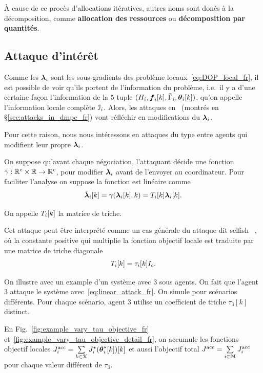\documentclass[../main.tex]{subfiles}
\begin{document}
À cause de ce procès d'allocations itératives, autres noms sont donés à la décomposition, comme \textbf{allocation des ressources} ou \textbf{décomposition par quantités}.

\subsection{Attaque d'intérêt}\label{sec:attack-interest_fr}

Comme les $\boldsymbol{\lambda}_{i}$ sont les sous-gradients des problème locaux~\eqref{eq:DOP_local_fr}, il est possible de voir qu'ils portent de l'information du problème, i.e.\ il y a d'une certaine façon l'information de la $5$-tuple $(H_{i},\vec{f}_{i}[k],\bar{\Gamma}_{i},\thetaik)$, qu'on appelle l'information locale complète $\mathcal{I}_{i}$.
Alors, les attaques en~\cite{VelardeEtAl2018} (montrés en \S\ref{sec:attacks_in_dmpc_fr}) vont réfléchir en modifications du $\boldsymbol{\lambda}_{i}$.

Pour cette raison, nous nous intéressons en attaques du type \fdi{} entre agents qui modifient leur propre $\boldsymbol{\lambda}_{i}$.

On suppose qu'avant chaque négociation, l'attaquant décide une fonction ${\gamma:\mathbb{R}^{c}\times\mathbb{R}\to \mathbb{R}^{c}}$, pour modifier $\boldsymbol{\lambda}_{i}$ avant de l'envoyer au coordinateur.
Pour faciliter l'analyse on suppose la fonction est linéaire comme
\begin{equation}
  \label{eq:linear_attack_fr}
  \lambdaicheat[k]=\gamma(\lambdaik,k)=\Tik\lambdaik.
\end{equation}

On appelle $T_{i}[k]$ la matrice de triche.

Cet attaque peut être interprété comme un cas générale du attaque dit selfish ~\cite{VelardeEtAl2018},
où la constante positive qui multiplie la fonction objectif locale est traduite par une matrice de triche diagonale
\begin{equation}
  \label{eq:selfish_attack}
  T_{i}[k]=\tau_{i}[k] I_{c}.
\end{equation}

On illustre avec un example d'un système avec $3$ sous agents.
On fait que l'agent $3$ attaque le système avec~\eqref{eq:linear_attack_fr}.
On simule pour scénarios différents.
Pour chaque scénario, agent $3$ utilise un coefficient de triche $\tau_{3}[k]$ distinct.

En Fig.~\ref{fig:example_vary_tau_objective_fr} et~\ref{fig:example_vary_tau_objective_detail_fr}, on accumule les fonctions objectif locales ${J_{i}^{\text{acc}}=\sum\limits_{k\in\mathcal{K}}J_{i}^{\star}(\boldsymbol{\theta}_i^{\star}[k])[k]}$
et aussi l'objectif total ${J^{\text{acc}}=\sum\limits_{i\in\mathcal{M}}J_{i}^{\text{acc}}}$ pour chaque valeur différent de $\tau_{3}$.
\end{document}

